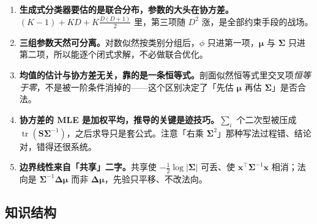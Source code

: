 \documentclass[11pt,a4paper,fontset=windows,zihao=-4]{ctexart}
\newcommand{\bx}{\mathbf{x}}
\newcommand{\bS}{\mathbf{S}}
\newcommand{\bSigma}{\boldsymbol{\Sigma}}
\newcommand{\bmu}{\boldsymbol{\mu}}
\newcommand{\bDelta}{\boldsymbol{\Delta}}
\newcommand{\tp}{^{\top}}
\newcommand{\abs}[1]{\lvert #1\rvert}
\DeclareMathOperator{\tr}{tr}
\begin{document}
\begin{enumerate}[label=\textcolor{navy}{\bfseries\arabic*.},leftmargin=2.3em,itemsep=0.55em]
  \item \textbf{生成式分类器要估的是联合分布，参数的大头在协方差。}$(K-1)+KD+K\frac{D(D+1)}{2}$ 里，第三项随 $D^2$ 涨，是全部约束手段的战场。
  \item \textbf{三组参数天然可分离。}对数似然按类别分组后，$\phi$ 只进第一项，$\bmu$ 与 $\bSigma$ 只进第二项，所以能逐个闭式求解，不必做联合优化。
  \item \textbf{均值的估计与协方差无关，靠的是一条恒等式。}剖面似然恒等式里交叉项\emph{恒等于零}，不是被一阶条件消掉的——这个区别决定了「先估 $\bmu$ 再估 $\bSigma$」是否合法。
  \item \textbf{协方差的 MLE 是加权平均，推导的关键是迹技巧。}$\sum_i$ 个二次型被压成 $\tr(\bS\bSigma^{-1})$，之后求导只是套公式。注意「右乘 $\bSigma^2$」那种写法过程错、结论对，错得还很系统。
  \item \textbf{边界线性来自「共享」二字。}共享使 $-\frac12\log\abs{\bSigma}$ 可丢、使 $\bx\tp\bSigma^{-1}\bx$ 相消；法向是 $\bSigma^{-1}\bDelta\bmu$ 而非 $\bDelta\bmu$，先验只平移、不改法向。
\end{enumerate}

\subsection{知识结构}
\end{document}
